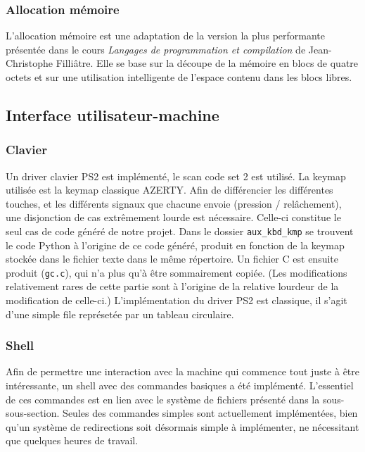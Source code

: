 \documentclass[a4paper, 11pt, twoside]{article}
\begin{document}
\subsubsection{Allocation mémoire}

L'allocation mémoire est une adaptation de la version la plus performante
présentée dans le cours \emph{Langages de programmation et compilation} de
Jean-Christophe Filliâtre. Elle se base sur la découpe de la mémoire en blocs de
quatre octets et sur une utilisation intelligente de l'espace contenu dans les
blocs libres.

\subsection{Interface utilisateur-machine}

\subsubsection{Clavier}

Un driver clavier PS2 est implémenté, le scan code set 2 est utilisé. La keymap utilisée
est la keymap classique AZERTY. Afin de différencier les différentes touches, et les
différents signaux que chacune envoie (pression / relâchement), une disjonction de cas
extrêmement lourde est nécessaire. Celle-ci constitue le seul cas de code généré de notre
projet.
Dans le dossier \texttt{aux_kbd_kmp} se trouvent le code Python à l'origine de ce code généré,
produit en fonction de la keymap stockée dans le fichier texte dans le même répertoire.
Un fichier C est ensuite produit (\texttt{gc.c}), qui n'a plus qu'à être sommairement copiée.
(Les modifications relativement rares de cette partie sont à l'origine de la relative lourdeur
de la modification de celle-ci.)
L'implémentation du driver PS2 est classique, il s'agit d'une simple file représetée par un 
tableau circulaire.

\subsubsection{Shell}

Afin de permettre une interaction avec la machine qui commence tout juste à être intéressante, 
un shell avec des commandes basiques a été implémenté. L'essentiel de ces commandes est en lien 
avec le système de fichiers présenté dans la sous-sous-section.
Seules des commandes simples sont actuellement implémentées, bien qu'un système de redirections 
soit désormais simple à implémenter, ne nécessitant que quelques heures de travail.
\end{document}

